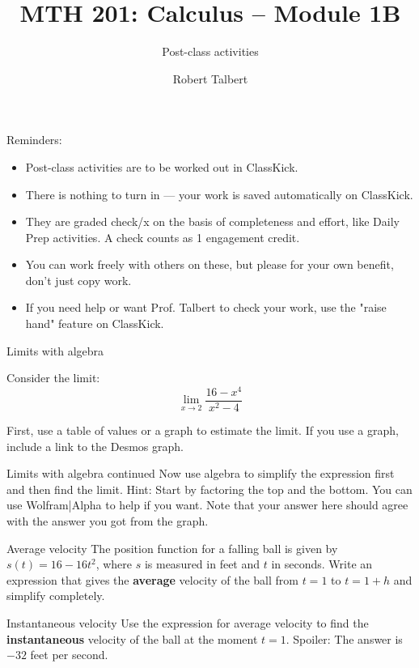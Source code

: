 \documentclass[10pt]{beamer}
\title{MTH 201: Calculus -- Module 1B}
\subtitle{Post-class activities}
\date{}
\author{Robert Talbert}
\institute{Grand Valley State University}
\begin{document}
\maketitle

\begin{frame}{Reminders:}

\begin{itemize}
    \item Post-class activities are to be worked out in ClassKick.
    \item There is nothing to turn in --- your work is saved automatically on ClassKick. 
    \item They are graded check/x on the basis of completeness and effort, like Daily Prep activities. A check counts as 1 engagement credit. 
    \item You can work freely with others on these, but please for your own benefit, don't just copy work. 
    \item If you need help or want Prof. Talbert to check your work, use the "raise hand" feature on ClassKick. 
\end{itemize}

\end{frame}



\begin{frame}[t]{Limits with algebra}

Consider the limit: 
$$\lim_{x \to 2} \frac{16-x^4}{x^2-4}$$

First, use a table of values or a graph to estimate the limit. If you use a graph, include a link to the Desmos graph. 
\end{frame}

\begin{frame}[t]{Limits with algebra continued}
Now use algebra to simplify the expression first and then find the limit. Hint: Start by factoring the top and the bottom. You can use Wolfram|Alpha to help if you want. Note that your answer here should agree with the answer you got from the graph. 
    
\end{frame}

\begin{frame}[t]{Average velocity}
The position function for a falling ball is given by $s(t) = 16 - 16t^2$, where $s$ is measured in feet and $t$ in seconds. Write an expression that gives the \textbf{average} velocity of the ball from $t=1$ to $t = 1+h$ and simplify completely. 
\end{frame}

\begin{frame}[t]{Instantaneous velocity}
Use the expression for average velocity to find the \textbf{instantaneous} velocity of the ball at the moment $t=1$. Spoiler: The answer is $-32$ feet per second. 
\end{frame}
\end{document}
